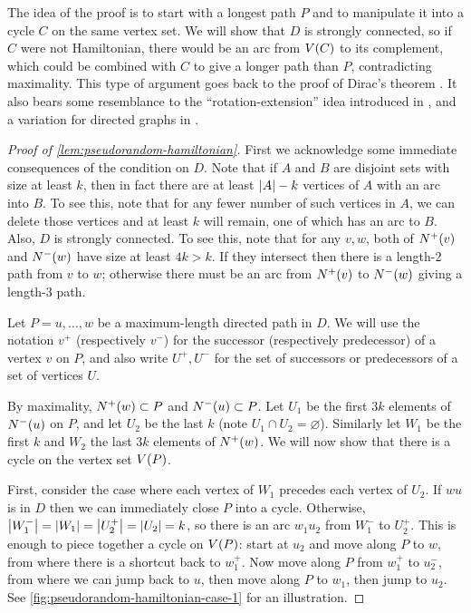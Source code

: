 \documentclass[11pt,english]{article}
\theoremstyle{plain}
\theoremstyle{definition}
\theoremstyle{definition}
\theoremstyle{plain}
\theoremstyle{plain}
\theoremstyle{plain}
\theoremstyle{plain}
\theoremstyle{remark}
\theoremstyle{remark}
\let\originalleft\left
\let\originalright\right
\renewcommand{\left}{\mathopen{}\mathclose\bgroup\originalleft}
\renewcommand{\right}{\aftergroup\egroup\originalright}
\begin{document}
The idea of the proof is to start with a longest path $P$ and to manipulate
it into a cycle $C$ on the same vertex set. We will show that $D$
is strongly connected, so if $C$ were not Hamiltonian, there would
be an arc from $V\left(C\right)$ to its complement, which could be
combined with $C$ to give a longer path than $P$, contradicting
maximality. This type of argument goes back to the proof of Dirac's
theorem \cite[Theorem~3]{Dir52}. It also bears some resemblance to
the ``rotation-extension'' idea introduced in \cite{Pos76}, and
a variation for directed graphs in \cite[Section~4.3]{FK05}.
\begin{proof}
[Proof of \ref{lem:pseudorandom-hamiltonian}]First we acknowledge
some immediate consequences of the condition on $D$. Note that if
$A$ and $B$ are disjoint sets with size at least $k$, then in fact
there are at least $\left|A\right|-k$ vertices of $A$ with an arc into $B$.
To see this, note that for any fewer number of such vertices in $A$,
we can delete those vertices and at least $k$ will remain, one of
which has an arc to $B$. Also, $D$ is strongly connected. To see
this, note that for any $v,w$, both of $N^{+}\left(v\right)$ and
$N^{-}\left(w\right)$ have size at least $4k>k$. If they intersect
then there is a length-2 path from $v$ to $w$; otherwise there must
be an arc from $N^{+}\left(v\right)$ to $N^{-}\left(w\right)$ giving
a length-3 path.

Let $P=u,\dots,w$ be a maximum-length directed path in $D$. We will
use the notation $v^{+}$ (respectively $v^{-}$) for the successor
(respectively predecessor) of a vertex $v$ on $P$, and also write
$U^{+},U^{-}$ for the set of successors or predecessors of a set
of vertices $U$.

By maximality, $N^{+}\left(w\right)\subset P$ and $N^{-}\left(u\right)\subset P$.
Let $U_{1}$ be the first $3k$ elements of $N^{-}\left(u\right)$
on $P$, and let $U_{2}$ be the last $k$ (note $U_{1}\cap U_{2}=\varnothing$).
Similarly let $W_{1}$ be the first $k$ and $W_{2}$ the last $3k$
elements of $N^{+}\left(w\right)$. We will now show that there is
a cycle on the vertex set $V\left(P\right)$.

First, consider the case where each vertex of $W_{1}$ precedes each
vertex of $U_{2}$. If $wu$ is in $D$ then we can immediately close
$P$ into a cycle. Otherwise, $\left|W_{1}^{-}\right|=\left|W_{1}\right|=\left|U_{2}^{+}\right|=\left|U_{2}\right|=k$,
so there is an arc $w_{1}u_{2}$ from $W_{1}^{-}$ to $U_{2}^{+}$.
This is enough to piece together a cycle on $V\left(P\right)$: start
at $u_{2}$ and move along $P$ to $w$, from where there is a shortcut
back to $w_{1}^{+}$. Now move along $P$ from $w_{1}^{+}$ to $u_{2}^{-}$,
from where we can jump back to $u$, then move along $P$ to $w_{1}$,
then jump to $u_{2}$. See \ref{fig:pseudorandom-hamiltonian-case-1}
for an illustration.


\end{proof}
\end{document}
